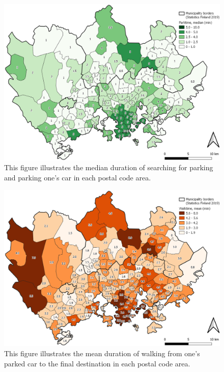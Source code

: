 \begin{figure}[H]%
    \centering
    \includegraphics[width=\textwidth]{images/thesis_postalvis_parkmedian.png}
    \caption[Parktime, median, in the reseach area]{This figure illustrates the median duration of searching for parking and parking one's car in each postal code area.}%
    \label{fig:postalvis_parkmedian}%
\end{figure}

\begin{figure}[H]%
    \centering
    \includegraphics[width=\textwidth]{images/thesis_postalvis_walkmean.png}
    \caption[Walktime, mean, in the research area]{This figure illustrates the mean duration of walking from one's parked car to the final destination in each postal code area.}%
    \label{fig:postalvis_walkmean}%
\end{figure}


